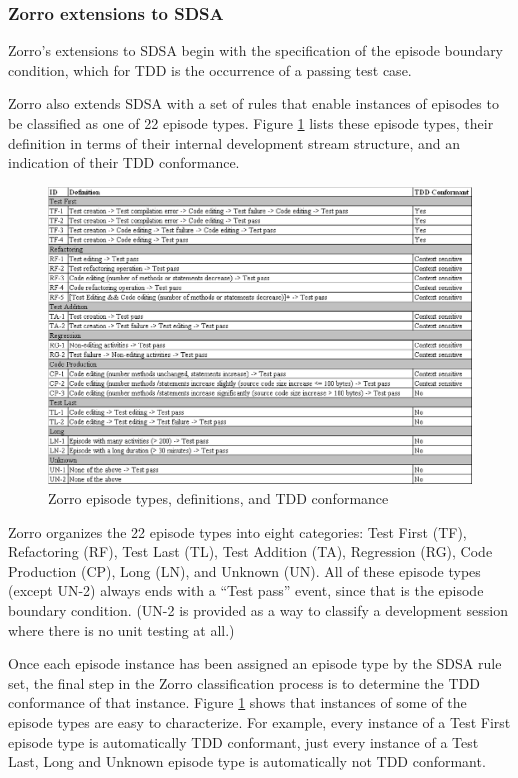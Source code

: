 \documentclass[smallextended]{svjour3}     %
\begin{document}
\subsubsection{Zorro extensions to SDSA}

Zorro's extensions to SDSA begin with the specification of the episode
boundary condition, which for TDD is the occurrence of a passing test case.

Zorro also extends SDSA with a set of rules that enable instances of
episodes to be classified as one of 22 episode types.  Figure
\ref{fig:Categories} lists these episode types, their definition in terms
of their internal development stream structure, and an indication of their
TDD conformance.

\begin{figure}[th]
  \center
  \includegraphics[width=1.0\textwidth]{episode-classification.eps}
  \caption{Zorro episode types, definitions, and TDD conformance}
  \label{fig:Categories}
\end{figure} 

Zorro organizes the 22 episode types into eight categories: Test First
(TF), Refactoring (RF), Test Last (TL), Test Addition (TA), Regression
(RG), Code Production (CP), Long (LN), and Unknown (UN).  All of these
episode types (except UN-2) always ends with a ``Test pass'' event, since that
is the episode boundary condition.  (UN-2 is provided as a way to classify
a development session where there is no unit testing at all.)

Once each episode instance has been assigned an episode type by the SDSA
rule set, the final step in the Zorro classification process is to
determine the TDD conformance of that instance.  Figure
\ref{fig:Categories} shows that instances of some of the episode types are
easy to characterize. For example, every instance of a Test First episode
type is automatically TDD conformant, just every instance of a Test Last,
Long and Unknown episode type is automatically not TDD conformant.
\end{document}
